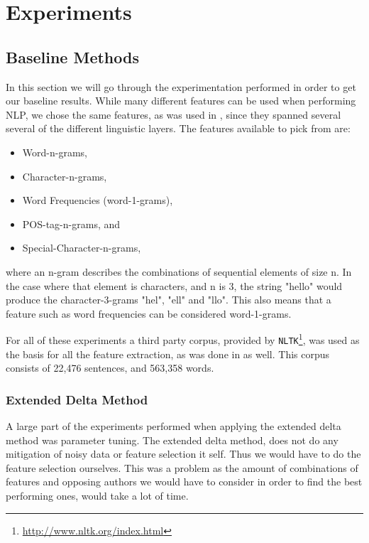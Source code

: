 \section{Experiments} \label{sec:experiments}


\subsection{Baseline Methods}

In this section we will go through the experimentation performed in order
to get our baseline results. While many different features can be used when
performing \gls{NLP}, we chose the same features, as was used in \cite{US},
since they spanned several several of the different linguistic layers. The
features available to pick from are:

\begin{itemize}
    \item Word-n-grams,
    \item Character-n-grams,
    \item Word Frequencies (word-1-grams),
    \item \gls{POS}-tag-n-grams, and
    \item Special-Character-n-grams,
\end{itemize}

where an n-gram describes the combinations of sequential elements of size n. In
the case where that element is characters, and n is 3, the string "hello" would
produce the character-3-grams "hel", "ell" and "llo". This also means that a
feature such as word frequencies can be considered word-1-grams.

For all of these experiments a third party corpus, provided by
\texttt{NLTK}\footnote{\url{http://www.nltk.org/index.html}}, was used as the
basis for all the feature extraction, as was done in \cite{US} as well. This
corpus consists of 22,476 sentences, and 563,358 words.


\subsubsection{Extended Delta Method}

A large part of the experiments performed when applying the extended delta
method was parameter tuning. The extended delta method, does not do any
mitigation of noisy data or feature selection it self. Thus we would have
to do the feature selection ourselves. This was a problem as the amount of
combinations of features and opposing authors we would have to consider in
order to find the best performing ones, would take a lot of time.

